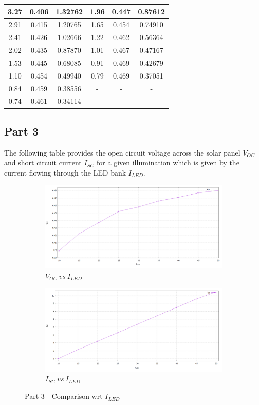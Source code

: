 \documentclass[12pt]{article}
\begin{document}
\begin{center}
\begin{tabular}{||c c c||c c c||}
3.27 & 0.406 & 1.32762 & 1.96 & 0.447 & 0.87612 \\ \hline
2.91 & 0.415 & 1.20765 & 1.65 & 0.454 & 0.74910 \\ \hline
2.41 & 0.426 & 1.02666 & 1.22 & 0.462 & 0.56364 \\ \hline
2.02 & 0.435 & 0.87870 & 1.01 & 0.467 & 0.47167 \\ \hline
1.53 & 0.445 & 0.68085 & 0.91 & 0.469 & 0.42679 \\ \hline
1.10 & 0.454 & 0.49940 & 0.79 & 0.469 & 0.37051 \\ \hline
0.84 & 0.459 & 0.38556 & - & - & - \\ \hline
0.74 & 0.461 & 0.34114 & - & - & - \\ \hline
\end{tabular}
\end{center}

\subsection{Part 3}

The following table provides the open circuit voltage across the solar panel \( V_{OC} \) and short circuit current \( I_{SC} \) for a given illumination which is given by the current flowing through the LED bank \( I_{LED} \).

\begin{figure}[H]
	\begin{subfigure}[b]{0.6\linewidth}
	   	\includegraphics[width = \linewidth, trim = {0 0 0 0}, clip]{Part3_V.png}
		\caption{\( V_{OC}\ vs\ I_{LED} \)}
	\end{subfigure}
	\begin{subfigure}[b]{0.6\linewidth}
		\includegraphics[width = \linewidth, trim = {0 0 0 0}, clip]{Part3_I.png}
		\caption{\( I_{SC}\ vs\ I_{LED} \)}
	\end{subfigure} 
	\caption{Part 3 - Comparison wrt \( I_{LED} \)}
\end{figure}
\end{document}
